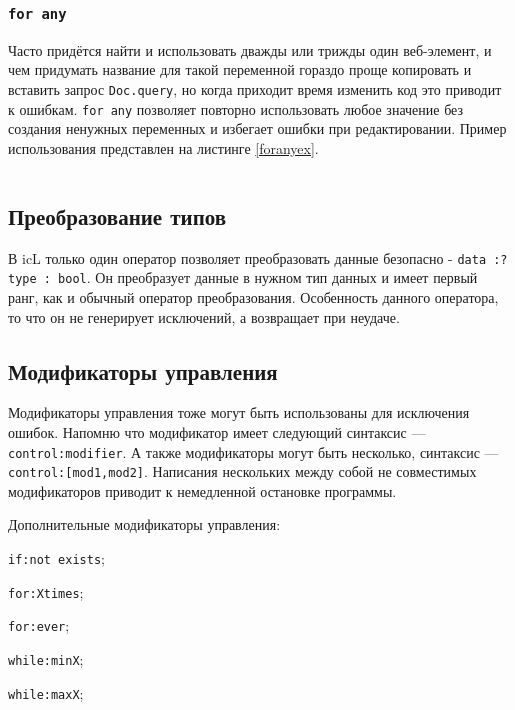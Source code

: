 \begin{sourcecode}
	\label{ifexistsex}
    \inputminted[linenos]{icl}{../sources/ifexistsex.icL}
\end{sourcecode}

\subsubsection{\texttt{for any}}

Часто придётся найти и использовать дважды или трижды один веб-элемент, и чем придумать название для такой переменной гораздо проще копировать и вставить запрос \texttt{Doc.query}, но когда приходит время изменить код это приводит к ошибкам. \texttt{for any} позволяет повторно использовать любое значение без создания ненужных переменных и избегает ошибки при редактировании. Пример использования представлен на листинге \ref{foranyex}.

\begin{sourcecode}
	\label{foranyex}
    \inputminted[linenos]{icl}{../sources/foranyex.icL}
\end{sourcecode}

\subsection{Преобразование типов}

В icL только один оператор позволяет преобразовать данные безопасно - \texttt{data :? type : bool}.
Он преобразует данные в нужном тип данных и имеет первый ранг, как и обычный оператор преобразования. Особенность данного оператора, то что он не генерирует исключений, а возвращает \void{} при неудаче.

\subsection{Модификаторы управления}

Модификаторы управления тоже могут быть использованы для исключения ошибок. Напомню что модификатор имеет следующий синтаксис — \texttt{control:modifier}. А также модификаторы могут быть несколько, синтаксис — \texttt{control:[mod1,mod2]}. Написания нескольких между собой не совместимых модификаторов приводит к немедленной остановке программы.

Дополнительные модификаторы управления:
\begin{icItems}
	\item \texttt{if:not exists};
	\item \texttt{for:Xtimes};
	\item \texttt{for:ever};
	\item \texttt{while:minX};
	\item \texttt{while:maxX};
\end{icItems}

